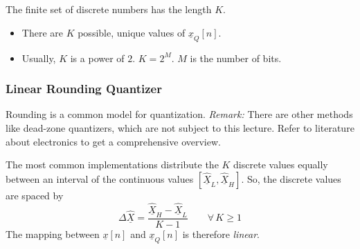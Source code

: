 \begin{refsection}
The finite set of discrete numbers has the length $K$.
\begin{itemize}
	\item There are $K$ possible, unique values of $\underline{x}_Q[n]$.
	\item Usually, $K$ is a power of $2$. $K = 2^M$. $M$ is the number of bits.
\end{itemize}

\subsubsection{Linear Rounding Quantizer}

Rounding is a common model for quantization. \textit{Remark:} There are other methods like dead-zone quantizers, which are not subject to this lecture. Refer to literature about electronics to get a comprehensive overview.

The most common implementations distribute the $K$ discrete values equally between an interval of the continuous values $[\underline{\hat{X}}_L, \underline{\hat{X}}_H]$. So, the discrete values are spaced by
\begin{equation}
	\Delta \underline{\hat{X}} = \frac{\underline{\hat{X}}_H - \underline{\hat{X}}_L}{K - 1} \qquad \forall \, K \geq 1
\end{equation}
The mapping between $\underline{x}[n]$ and $\underline{x}_Q[n]$ is therefore \emph{linear}.


\end{refsection}
